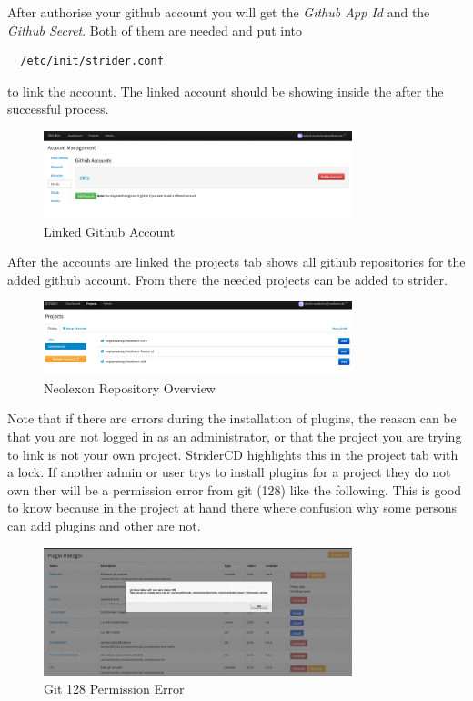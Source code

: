After authorise your github account you will get the \textit{Github App Id} and the \textit{Github Secret}. Both of them are needed and put
into

\begin{lstlisting}
  /etc/init/strider.conf
\end{lstlisting}

to link the account. The linked account should be showing inside the  after the successful process.

\begin{figure}[h!]
  \centering
  \includegraphics[width=0.8\textwidth]{images/linkedGithub.png}
  \caption{Linked Github Account}
\end{figure}

After the accounts are linked the projects tab shows all github repositories for the added github account. From there the needed projects can
be added to strider.

\begin{figure}[h!]
  \centering
  \includegraphics[width=0.8\textwidth]{images/neolexonGit.png}
  \caption{Neolexon Repository Overview}
\end{figure}

Note that if there are errors during the installation of plugins, the reason can be that you are not logged in as an administrator,
or that the project you are trying to link is not your own project. StriderCD highlights this in the project tab with a lock.
If another admin or user trys to install plugins for a project they do not own ther will be a permission error from git (128)
like the following. This is good to know because in the project at hand there where confusion why some persons can add plugins
and other are not.

\begin{figure}[h!]
  \centering
  \includegraphics[width=0.8\textwidth]{images/permissionError.png}
  \caption{Git 128 Permission Error}
\end{figure}


